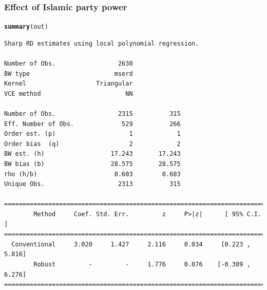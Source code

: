 \documentclass[12pt,english,dvipsnames,aspectratio=169,handout]{beamer}\usepackage[]{graphicx}\usepackage[]{xcolor}
\makeatletter
\newcommand{\hlnum}[1]{\textcolor[rgb]{0.686,0.059,0.569}{#1}}%
\newcommand{\hlstr}[1]{\textcolor[rgb]{0.192,0.494,0.8}{#1}}%
\newcommand{\hlopt}[1]{\textcolor[rgb]{0,0,0}{#1}}%
\newcommand{\hlstd}[1]{\textcolor[rgb]{0.345,0.345,0.345}{#1}}%
\newcommand{\hlkwb}[1]{\textcolor[rgb]{0.69,0.353,0.396}{#1}}%
\newcommand{\hlkwc}[1]{\textcolor[rgb]{0.333,0.667,0.333}{#1}}%
\newcommand{\hlkwd}[1]{\textcolor[rgb]{0.737,0.353,0.396}{\textbf{#1}}}%
\newenvironment{kframe}{%
 \def\at@end@of@kframe{}%
 \ifinner\ifhmode%
  \def\at@end@of@kframe{\end{minipage}}%
  \begin{minipage}{\columnwidth}%
 \fi\fi%
 \def\FrameCommand##1{\hskip\@totalleftmargin \hskip-\fboxsep
 \colorbox{shadecolor}{##1}\hskip-\fboxsep
     \hskip-\linewidth \hskip-\@totalleftmargin \hskip\columnwidth}%
 \MakeFramed {\advance\hsize-\width
   \@totalleftmargin\z@ \linewidth\hsize
   \@setminipage}}%
 {\par\unskip\endMakeFramed%
 \at@end@of@kframe}
\newenvironment{knitrout}{}{} %
\makeatother
\begin{document}

\begin{frame}[fragile]
\frametitle{Effect of Islamic party power}

\begin{knitrout}\tiny
{}\color{fgcolor}\begin{kframe}
\begin{alltt}
\hlkwd{summary}\hlstd{(out)}
\end{alltt}
\begin{verbatim}
Sharp RD estimates using local polynomial regression.

Number of Obs.                 2630
BW type                       mserd
Kernel                   Triangular
VCE method                       NN

Number of Obs.                 2315          315
Eff. Number of Obs.             529          266
Order est. (p)                    1            1
Order bias  (q)                   2            2
BW est. (h)                  17.243       17.243
BW bias (b)                  28.575       28.575
rho (h/b)                     0.603        0.603
Unique Obs.                    2313          315

=============================================================================
        Method     Coef. Std. Err.         z     P>|z|      [ 95% C.I. ]       
=============================================================================
  Conventional     3.020     1.427     2.116     0.034     [0.223 , 5.816]     
        Robust         -         -     1.776     0.076    [-0.309 , 6.276]     
=============================================================================
\end{verbatim}
\end{kframe}
\end{knitrout}
\end{frame}
\end{document}
